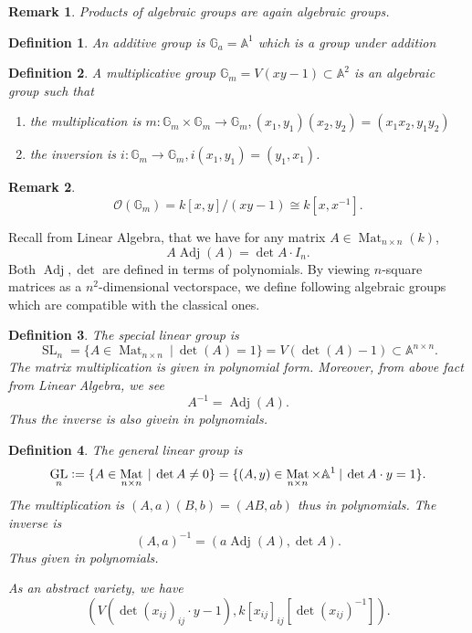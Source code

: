 \documentclass[10pt]{article}
\newtheorem{definition}{Definition}[section]
\newtheorem{remark}{Remark}[section]
\numberwithin{equation}{theorem}
\DeclareMathOperator{\GL}{GL}
\DeclareMathOperator{\SL}{SL}
\DeclareMathOperator{\Mat}{Mat}
\DeclareMathOperator{\Adj}{Adj}
\newcommand{\defeq}{\vcentcolon=}
\newcommand{\Ouv}[0]{\mathcal{O}}
\newcommand{\G}[0]{\mathbb{G}}
\newcommand{\A}[0]{\mathbb{A}}
\begin{document}
\begin{remark}
Products of algebraic groups are again algebraic groups.
\end{remark}
\begin{definition}
  An additive group is $\mathbb{G}_a= \A^1$ which is a group under addition
\end{definition}
\begin{definition}
  A multiplicative group $\mathbb{G}_m = V(xy-1)\subset\A^2$ is an algebraic group such that 
  \begin{enumerate}
    \item the multiplication is $m:\mathbb{G}_m \times\mathbb{G}_m \to\mathbb{G}_m , (x_1,y_1)(x_2,y_2) = (x_1x_2,y_1y_2)$
    \item the inversion is $i:\mathbb{G}_m \to\mathbb{G}_m , i(x_1,y_1) = (y_1,x_1)$.
  \end{enumerate}
\end{definition}
\begin{remark}
  \begin{equation*}
  \Ouv(\G_m) = k[x,y]/(xy-1)\cong k[x,x^{-1}].
  \end{equation*}
\end{remark}
Recall from Linear Algebra, that we have for any matrix $A\in \Mat_{n\times n}(k)$, 
\begin{equation*}
  A\Adj(A) = \det A\cdot I_n.
\end{equation*}
Both $\Adj,\det$ are defined in terms of polynomials. By viewing $n$-square matrices as a $n^2$-dimensional vectorspace, we define following algebraic groups which are compatible with the classical ones.
\begin{definition}
  The special linear group is
  \begin{equation*}
    \SL_n = \{A\in\Mat_{n\times n}\:|\: \det(A) = 1\} = V(\det(A) -1)\subset \A^{n\times n}.
  \end{equation*}
  The matrix multiplication is given in polynomial form. Moreover, from above fact from Linear Algebra, we see 
  \begin{equation*}
    A^{-1} = \Adj(A).
  \end{equation*}
  Thus the inverse is also givein in polynomials.
\end{definition}
\begin{definition}
  The general linear group is 
  \begin{equation*}
    \GL_n \defeq \{A\in\Mat_{n\times n}\:|\: \det A \not=0\} = \{(A,y)\in\Mat_{n\times n}\times\A^1\:|\: \det A\cdot y = 1\}.
  \end{equation*}
  The multiplication is $(A,a)(B,b) = (AB,ab)$ thus in polynomials. The inverse is 
  \begin{equation*}
    (A,a)^{-1} = (a\Adj(A),\det A).
  \end{equation*}
  Thus given in polynomials.
  \par As an abstract variety, we have
  \begin{equation*}
    (V(\det(x_{ij})_{ij}\cdot y -1),k[x_{ij}]_{ij}[\det(x_{ij})^{-1}]).
  \end{equation*}
\end{definition}
\end{document}
